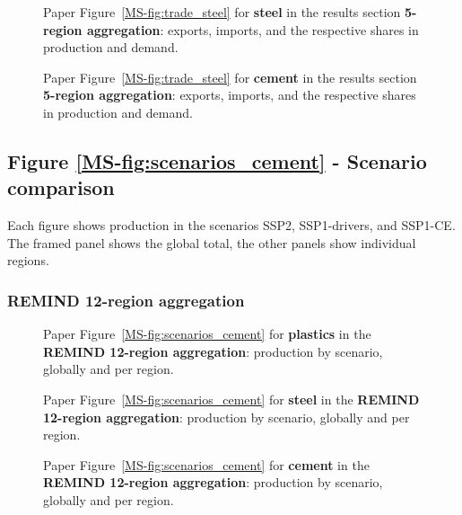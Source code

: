 \begin{figure}[htbp]
    \centering
    \caption{Paper Figure~\ref{MS-fig:trade_steel} for \textbf{steel} in the results section \textbf{5-region aggregation}: exports, imports, and the respective shares in production and demand.}
    \label{fig:figure_7_steel_agg5}
\end{figure}

\begin{figure}[htbp]
    \centering
    \caption{Paper Figure~\ref{MS-fig:trade_steel} for \textbf{cement} in the results section \textbf{5-region aggregation}: exports, imports, and the respective shares in production and demand.}
    \label{fig:figure_7_cement_agg5}
\end{figure}

\clearpage
\subsection{Figure \texorpdfstring{\ref{MS-fig:scenarios_cement}}{8} - Scenario comparison} \label{sec:add_fig_8}

Each figure shows production in the scenarios SSP2, SSP1-drivers, and SSP1-CE.
The framed panel shows the global total, the other panels show individual regions.

\subsubsection{REMIND 12-region aggregation}

\begin{figure}[htbp]
    \centering
    \caption{Paper Figure~\ref{MS-fig:scenarios_cement} for \textbf{plastics} in the \textbf{REMIND 12-region aggregation}: production by scenario, globally and per region.}
    \label{fig:figure_8_plastics_h12}
\end{figure}

\begin{figure}[htbp]
    \centering
    \caption{Paper Figure~\ref{MS-fig:scenarios_cement} for \textbf{steel} in the \textbf{REMIND 12-region aggregation}: production by scenario, globally and per region.}
    \label{fig:figure_8_steel_h12}
\end{figure}

\begin{figure}[htbp]
    \centering
    \caption{Paper Figure~\ref{MS-fig:scenarios_cement} for \textbf{cement} in the \textbf{REMIND 12-region aggregation}: production by scenario, globally and per region.}
    \label{fig:figure_8_cement_h12}
\end{figure}


